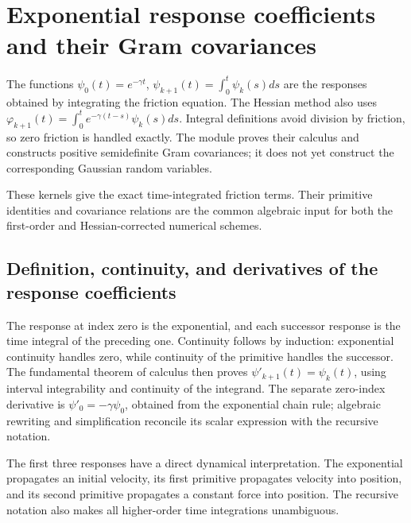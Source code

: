\documentclass[11pt,a4paper]{report}
\begin{document}
\section{\texorpdfstring{Exponential response coefficients and their Gram covariances}{Exponential response coefficients and their Gram covariances}}
\label{proof-module-KineticLangevin-Coefficients-lean}


The functions \(\psi_0(t)=e^{-\gamma t}\), \(\psi_{k+1}(t)=\int_0^t\psi_k(s)ds\) are the responses obtained by integrating the friction equation. The Hessian method also uses \(\varphi_{k+1}(t)=\int_0^te^{-\gamma(t-s)}\psi_k(s)ds\). Integral definitions avoid division by friction, so zero friction is handled exactly. The module proves their calculus and constructs positive semidefinite Gram covariances; it does not yet construct the corresponding Gaussian random variables.



These kernels give the exact time-integrated friction terms. Their primitive identities and covariance relations are the common algebraic input for both the first-order and Hessian-corrected numerical schemes.

\subsection{\texorpdfstring{Definition, continuity, and derivatives of the response coefficients}{Definition, continuity, and derivatives of the response coefficients}}
\label{report-step-KineticLangevin-Coefficients-lean-1}


The response at index zero is the exponential, and each successor response is the time integral of the preceding one. Continuity follows by induction: exponential continuity handles zero, while continuity of the primitive handles the successor. The fundamental theorem of calculus then proves \(\psi'_{k+1}(t)=\psi_k(t)\), using interval integrability and continuity of the integrand. The separate zero-index derivative is \(\psi'_0=-\gamma\psi_0\), obtained from the exponential chain rule; algebraic rewriting and simplification reconcile its scalar expression with the recursive notation.



The first three responses have a direct dynamical interpretation. The exponential propagates an initial velocity, its first primitive propagates velocity into position, and its second primitive propagates a constant force into position. The recursive notation also makes all higher-order time integrations unambiguous.
\end{document}
